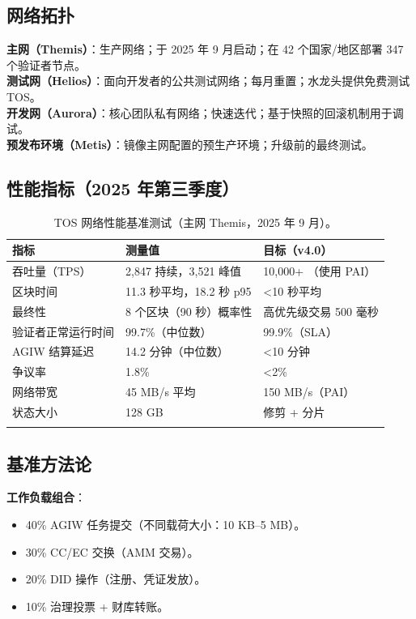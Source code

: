 \documentclass[11pt]{article}
\begin{document}
\subsection{网络拓扑}

\textbf{主网（Themis）}：生产网络；于 2025 年 9 月启动；在 42 个国家/地区部署 347 个验证者节点。\\
\textbf{测试网（Helios）}：面向开发者的公共测试网络；每月重置；水龙头提供免费测试 TOS。\\
\textbf{开发网（Aurora）}：核心团队私有网络；快速迭代；基于快照的回滚机制用于调试。\\
\textbf{预发布环境（Metis）}：镜像主网配置的预生产环境；升级前的最终测试。

\subsection{性能指标（2025 年第三季度）}

\begin{longtable}{@{}p{}p{}p{}@{}}
\toprule
\textbf{指标} & \textbf{测量值} & \textbf{目标（v4.0）} \\\midrule
吞吐量（TPS） & 2,847 持续，3,521 峰值 & 10,000+ （使用 PAI） \\
区块时间 & 11.3 秒平均，18.2 秒 p95 & <10 秒平均 \\
最终性 & 8 个区块（90 秒）概率性 & 高优先级交易 500 毫秒 \\
验证者正常运行时间 & 99.7\%（中位数） & 99.9\%（SLA） \\
AGIW 结算延迟 & 14.2 分钟（中位数） & <10 分钟 \\
争议率 & 1.8\% & <2\% \\
网络带宽 & 45 MB/s 平均 & 150 MB/s（PAI） \\
状态大小 & 128 GB & 修剪 + 分片 \\
\bottomrule
\caption{TOS 网络性能基准测试（主网 Themis，2025 年 9 月）。}
\end{longtable}

\subsection{基准方法论}

\textbf{工作负载组合}：
\begin{itemize}[noitemsep]
  \item 40\% AGIW 任务提交（不同载荷大小：10 KB--5 MB）。
  \item 30\% CC/EC 交换（AMM 交易）。
  \item 20\% DID 操作（注册、凭证发放）。
  \item 10\% 治理投票 + 财库转账。
\end{itemize}
\end{document}
